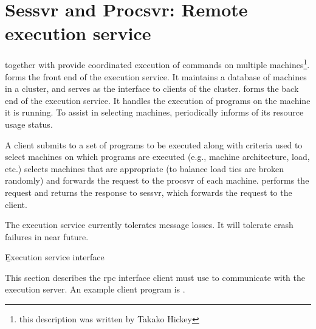%
%
%
\section{Sessvr and Procsvr: Remote execution service}

 together with  provide
coordinated execution of commands on multiple machines\footnote{this
description was written by Takako Hickey}.
 forms the front end of the execution service.
It maintains a database of machines in a cluster, and serves
as the interface to clients of the cluster.
 forms the back end of the execution service.
It handles the execution of programs on the machine it is running.
To assist  in selecting machines, 
periodically informs  of its resource usage status.

A client submits to  a set of programs to be executed
along with criteria used to select machines on which programs
are executed (e.g., machine architecture, load, etc.)
 selects machines that are appropriate (to balance load
ties are broken randomly) and forwards the
request to the procsvr of each machine.
 performs the request and returns the response to sessvr,
which forwards the request to the client.

The execution service currently tolerates message losses.
It will tolerate crash failures in near future.


\b{Execution service interface}

This section describes the rpc interface client must use to
communicate with the execution server.
An example client program is .


